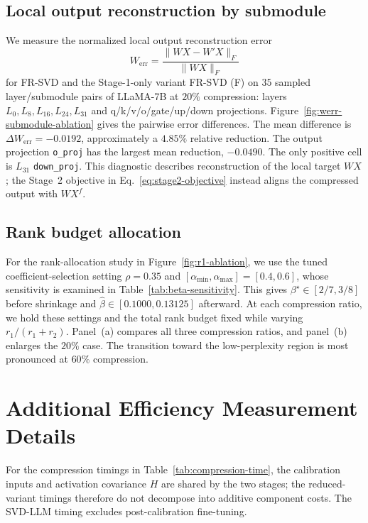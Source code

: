 \subsection{Local output reconstruction by submodule}\label{app:submodule-reconstruction}
We measure the normalized local output reconstruction error
\begin{equation}
W_{\mathrm{err}}=\frac{\|WX-W'X\|_F}{\|WX\|_F}
\label{eq:app-werr}
\end{equation}
for FR-SVD and the Stage-1-only variant FR-SVD (F) on $35$ sampled layer/submodule pairs of LLaMA-7B at $20\%$ compression: layers $L_0,L_8,L_{16},L_{24},L_{31}$ and q/k/v/o/gate/up/down projections. Figure~\ref{fig:werr-submodule-ablation} gives the pairwise error differences. The mean difference is $\Delta W_{\mathrm{err}}=-0.0192$, approximately a $4.85\%$ relative reduction. The output projection \texttt{o\_proj} has the largest mean reduction, $-0.0490$. The only positive cell is $L_{31}$ \texttt{down\_proj}. This diagnostic describes reconstruction of the local target $WX$; the Stage~2 objective in Eq.~\eqref{eq:stage2-objective} instead aligns the compressed output with $WX^f$.



\subsection{Rank budget allocation}\label{app:rank-allocation}
For the rank-allocation study in Figure~\ref{fig:r1-ablation}, we use the tuned coefficient-selection setting $\rho=0.35$ and $[\alpha_{\min},\alpha_{\max}]=[0.4,0.6]$, whose sensitivity is examined in Table~\ref{tab:beta-sensitivity}. This gives $\beta^\star\in[2/7,3/8]$ before shrinkage and $\widehat\beta\in[0.1000,0.13125]$ afterward. At each compression ratio, we hold these settings and the total rank budget fixed while varying $r_1/(r_1+r_2)$. Panel~(a) compares all three compression ratios, and panel~(b) enlarges the $20\%$ case. The transition toward the low-perplexity region is most pronounced at $60\%$ compression.



\section{Additional Efficiency Measurement Details}\label{app:efficiency}

For the compression timings in Table~\ref{tab:compression-time}, the calibration inputs and activation covariance $H$ are shared by the two stages; the reduced-variant timings therefore do not decompose into additive component costs. The SVD-LLM timing excludes post-calibration fine-tuning.

